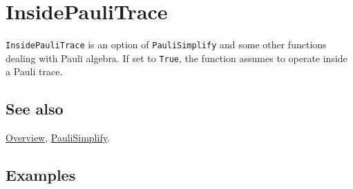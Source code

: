 \documentclass[../FeynCalcManual.tex]{subfiles}
\begin{document}
\hypertarget{insidepaulitrace}{
\section{InsidePauliTrace}\label{insidepaulitrace}}

\texttt{InsidePauliTrace} is an option of \texttt{PauliSimplify} and
some other functions dealing with Pauli algebra. If set to
\texttt{True}, the function assumes to operate inside a Pauli trace.

\subsection{See also}

\hyperlink{toc}{Overview}, \hyperlink{paulisimplify}{PauliSimplify}.

\subsection{Examples}
\end{document}
